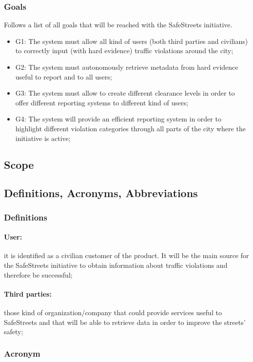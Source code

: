 \documentclass{article}
\begin{document}
    \subsubsection{Goals} Follows a list of all goals that will be reached with the SafeStreets initiative.
    \begin{itemize}
        \item G1: The system must allow all kind of users (both third parties and civilians) to correctly input (with hard evidence) traffic violations around the city;
        \item G2: The system must autonomously retrieve metadata from hard evidence useful to report and to all users;
        \item G3: The system must allow to create different clearance levels in order to offer different reporting systems to different kind of users;
        \item G4: The system will provide an efficient reporting system in order to highlight different violation categories through all parts of the city where the initiative is active;
    \end{itemize}
\subsection{Scope}
\subsection{Definitions, Acronyms, Abbreviations}
\subsubsection{Definitions}
\paragraph{User:} it is identified as a civilian customer of the product. It will be the main source for the SafeStreets initiative to obtain information about traffic violations and therefore be successful;
\paragraph{Third parties:}those kind of organization/company that could provide services useful to SafeStreets and that will be able to retrieve data in order to improve the streets' safety;
\subsubsection{Acronym}
\end{document}
